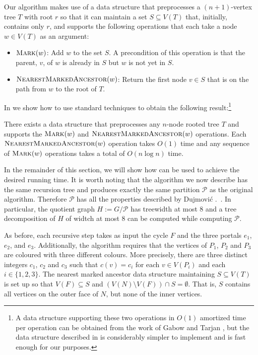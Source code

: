 \documentclass[kpfonts]{patmorin}
\begin{document}
Our algorithm makes use of a data structure that preprocesses a $(n+1)$-vertex tree $T$ with root $r$ so that it can maintain a set $S\subseteq V(T)$ that, initially, contains only $r$, and supports the following operations that each take a node $w\in V(T)$ as an argument:

\begin{itemize}
    \item $\textsc{Mark}(w)$: Add $w$ to the set $S$.  A precondition of this operation is that the parent, $v$, of $w$ is already in $S$ but $w$ is not yet in $S$.

    \item $\textsc{NearestMarkedAncestor}(w)$:  Return the first node $v\in S$ that is on the path from $w$ to the root of $T$.
\end{itemize}

In  we show how to use standard techniques to obtain the following result:\footnote{A data structure supporting these two operations in $O(1)$ amortized time per operation can be obtained from the work of Gabow and Tarjan \cite{gabow.tarjan:linear}, but the data structure described in  is considerably simpler to implement and is fast enough for our purposes.}

\begin{lem}
    There exists a data structure that preprocesses any $n$-node rooted tree $T$ and supports the $\textsc{Mark}(w)$ and $\textsc{NearestMarkedAncestor}(w)$ operations. Each $\textsc{NearestMarkedAncestor}(w)$ operation takes $O(1)$ time and any sequence of $\textsc{Mark}(w)$ operations takes a total of $O(n\log n)$ time.
\end{lem}

In the remainder of this section, we will show how  can be used to achieve the desired running time.  It is worth noting that the algorithm we now describe has the same recursion tree and produces exactly the same partition $\mathcal{P}$ as the original algorithm.  Therefore $\mathcal{P}$ has all the properties described by Dujmović \etal.\ \cite{dujmovic.joret.ea:planar}. In particular, the quotient graph $H:=G/\mathcal{P}$ has treewidth at most $8$ and a tree decomposition of $H$ of widtch at most $8$ can be computed while computing $\mathcal{P}$.

As before, each recursive step takes as input the cycle $F$ and the three portals $e_1$, $e_2$, and $e_3$.  Additionally, the algorithm requires that the vertices of $P_1$, $P_2$ and $P_3$ are coloured with three different colours.  More precisely, there are three distinct integers $c_1$, $c_2$ and $c_3$ such that $c(v)=c_i$ for each $v\in V(P_i)$ and each $i\in\{1,2,3\}$.  The nearest marked ancestor data structure maintaining $S\subseteq V(T)$ is set up so that $V(F)\subseteq S$ and $(V(N)\setminus V(F))\cap S=\emptyset$.  That is, $S$ contains all vertices on the outer face of $N$, but none of the inner vertices.
\end{document}
